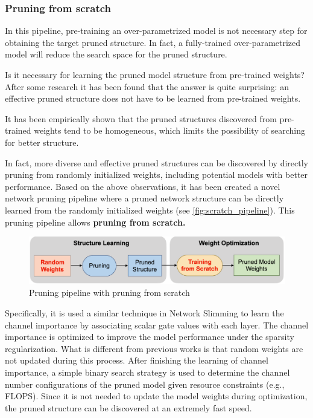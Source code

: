 \subsubsection{Pruning from scratch}
In this pipeline, pre-training an over-parametrized model is not necessary
step for obtaining the target pruned structure. In fact, a fully-trained
over-parametrized model will reduce the search space for the pruned structure.

Is it necessary for learning the pruned model structure from pre-trained
weights?
After some research it has been found that the answer is quite surprising: an
effective pruned structure does not have to be learned from pre-trained
weights.

It has been empirically shown that the pruned structures discovered from
pre-trained weights tend to be homogeneous, which limits the possibility of
searching for better structure.

In  fact, more diverse and effective pruned structures can be discovered by
directly pruning from randomly initialized weights, including  potential models
with better performance. Based  on  the  above  observations, it has been
created a novel network pruning pipeline where a pruned network structure can
be directly learned from the randomly initialized weights (see
\autoref{fig:scratch_pipeline}). This pruning pipeline allows \textbf{pruning
from scratch.}

\begin{figure}[ht]
    \includegraphics[width=\textwidth]{images/pruning/scratch_pipeline.png}
    \centering
    \caption{Pruning pipeline with pruning from scratch}\label{fig:scratch_pipeline}
\end{figure}

Specifically, it is used a similar technique in Network Slimming to learn the
channel importance by associating scalar gate values with each layer.
The channel importance is optimized to improve the model performance under the
sparsity regularization.
What is different from previous works is that random weights are not updated
during this process. After finishing the learning of channel importance, a
simple binary search strategy is used to determine the channel number
configurations of the pruned model given resource constraints (e.g., FLOPS).
Since it is not needed to update the model weights during optimization, the
pruned structure can be discovered at an extremely fast speed.

